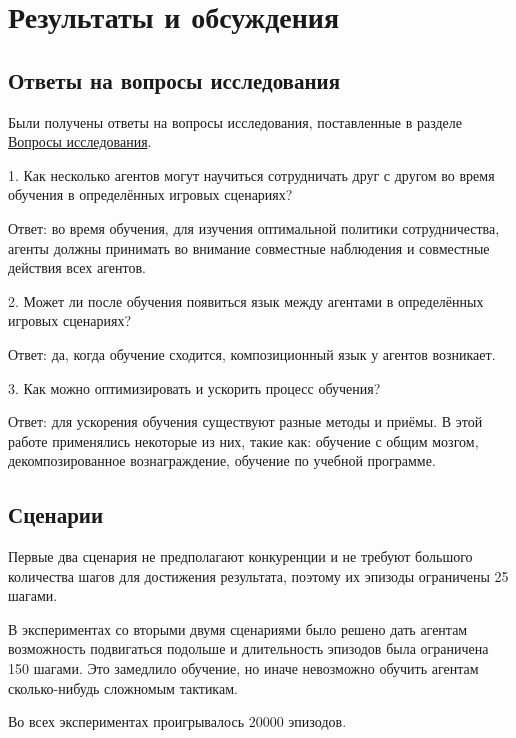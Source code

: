 \chapter{Результаты и обсуждения}


\section{Ответы на вопросы исследования}

Были получены ответы на вопросы исследования, поставленные в разделе \hyperref[intro-questions]{Вопросы исследования}.

1. Как несколько агентов могут научиться сотрудничать друг с другом во время обучения в определённых игровых сценариях?

Ответ: во время обучения, для изучения оптимальной политики сотрудничества, агенты должны принимать во внимание совместные наблюдения и совместные действия всех агентов.

2. Может ли после обучения появиться язык между агентами в определённых игровых сценариях?

Ответ: да, когда обучение сходится, композиционный язык у агентов возникает.

3. Как можно оптимизировать и ускорить процесс обучения?

Ответ: для ускорения обучения существуют разные методы и приёмы. В этой работе применялись некоторые из них, такие как: обучение с общим мозгом, декомпозированное вознаграждение, обучение по учебной программе.

\newpage

\section{Сценарии}

Первые два сценария не предполагают конкуренции и не требуют большого количества шагов для достижения результата, поэтому их эпизоды ограничены 25 шагами.

В экспериментах со вторыми двумя сценариями было решено дать агентам возможность подвигаться подольше и длительность эпизодов была ограничена 150 шагами. Это замедлило обучение, но иначе невозможно обучить агентам сколько-нибудь сложномым тактикам.

Во всех экспериментах проигрывалось 20000 эпизодов.







